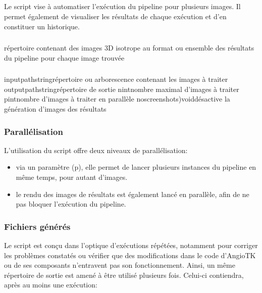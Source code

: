 	\subsection{\masterpy}
	\label{pipeline:master}
	
Le script \masterpy vise à automatiser l'exécution du pipeline pour plusieurs images. Il permet également de visualiser les résultats de chaque exécution et d'en constituer un historique.

	\subsubsection{\ioT}

\iolist
{répertoire contenant des images 3D isotrope au format \mha ou \nii}
{ensemble des résultats du pipeline pour chaque image trouvée}


	\subsubsection{\argsT}

\args
{inputpath}{}{string}{répertoire ou arborescence contenant les images à traiter}
{outputpath}{}{string}{répertoire de sortie}
{n}{}{int}{nombre maximal d'images à traiter}
{p}{}{int}{nombre d'images à traiter en parallèle}
{noscreenshots)}{}{void}{désactive la génération d'images des résultats}
\stoparg

	\subsubsection{Parallélisation}
L'utilisation du script \masterpy offre deux niveaux de parallélisation: 
\begin{itemize}
	\item via un paramètre (p), elle permet de lancer plusieurs instances du pipeline en même temps, pour autant d'images. 
	\item le rendu des images de résultats est également lancé en parallèle, afin de ne pas bloquer l'exécution du pipeline.
\end{itemize}

	\subsubsection{Fichiers générés}

Le script est conçu dans l'optique d'exécutions répétées, notamment pour corriger les problèmes constatés ou vérifier que des modifications dans le code d'AngioTK ou de ses composants n'entravent pas son fonctionnement. Ainsi, un même répertoire de sortie est amené à être utilisé plusieurs fois. Celui-ci contiendra, après au moins une exécution:

